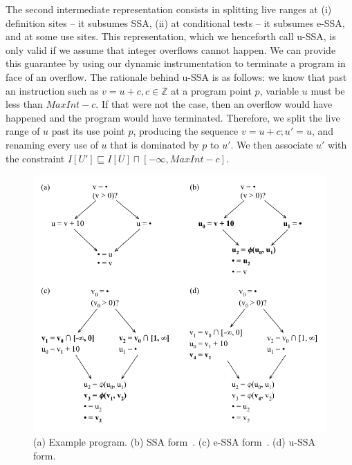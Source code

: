 \documentclass{sigplanconf}[10pt]
\begin{document}
The second intermediate representation consists in splitting live ranges at
(i) definition sites -- it subsumes SSA, (ii) at conditional tests -- it
subsumes e-SSA, and at some use sites.
This representation, which we henceforth call u-SSA, is only valid if we
assume that integer overflows cannot happen.
We can provide this guarantee by using our dynamic instrumentation to terminate
a program in face of an overflow.
The rationale behind u-SSA is as follows: we know that past an instruction such
as $v = u + c, c \in \mathbb{Z}$ at a program point $p$, variable $u$ must be
less than $\mathit{MaxInt} - c$.
If that were not the case, then an overflow would have happened and the
program would have terminated.
Therefore, we split the live range of $u$ past its use point $p$, producing the
sequence $v = u + c; u' = u$, and renaming every use of $u$ that is dominated
by $p$ to $u'$.
We then associate $u'$ with the constraint $I[U'] \sqsubseteq I[U] \sqcap [-\infty, \mathit{MaxInt} - c]$.

\begin{figure}[t!]
\begin{center}
\includegraphics[width=\columnwidth]{images/ex_ir}
\end{center}
\caption{\label{fig:ex_ir}
(a) Example program.
(b) SSA form~\cite{Cytron91}.
(c) e-SSA form~\cite{Bodik00}.
(d) u-SSA form.}
\end{figure}
\end{document}
